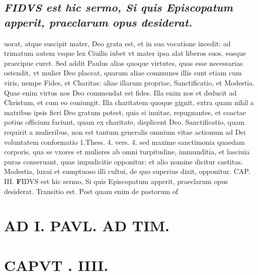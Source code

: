 \documentclass{article}
\begin{document}
\begin{pages}
\subsection*{\textit{FIDVS est hic sermo, Si quis Episcopatum apperit, praeclarum opus desiderat.}}uorat, atque suscipit mater, Deo grata est, et in sua vocatione incedit: ad trimatum autem vsque lex Ciuilis iubet vt mater ipsa alat liberos suos, eosque praecipue curet. Sed addit Paulus alias quoque virtutes, quas esse necessarias ostendit, vt mulier Deo placeat, quarum aliae communes illis sunt etiam cum viris, nempe Fides, et Charitas: aliae illarum propriae, Sanctificatio, et Modestia. Quae enim virtus nos Deo commendat est fides. Illa enim nos et deducit ad Christum, et cum eo coniungit. Illa charitatem quoque gignit, extra quam nihil a matribus ipsis fieri Deo gratum potest, quia si inuitae, repugnantes, et coactae potius officium faciunt, quam ex charitate, displicent Deo. Sanctificatio, quam requirit a mulieribus, non est tantum generalis omnium vitae actionum ad Dei voluntatem conformatio 1.Thess. 4. vers. 4. sed maxime sanctimonia quaedam corporis, qua se vxores et mulieres ab omni turpitudine, immunditia, et lasciuia puras conseruant, quae impudicitie opponitur: et alio nomine dicitur castitas. Modestia, luxui et sumptuoso illi cultui, de quo superius dixit, opponitur. CAP. III.
\textbf{F}IDVS est hic sermo, Si quis Episcopatum apperit, praeclarum opus desiderat. Transitio est. Post quam enim de pastorum of\pend
\endnumbering
\section*{AD I. PAVL. AD TIM. }
\section{CAPVT . IIII. }
\beginnumbering
\marginpar{[ p.180 ]}\pstart {}
{}

\end{pages}
\end{document}
